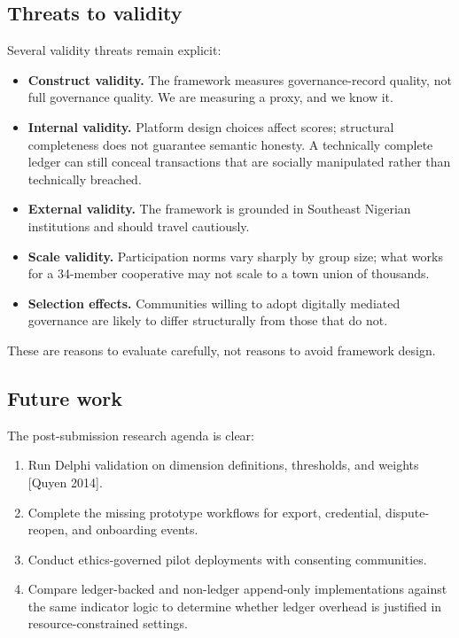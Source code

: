 \documentclass[sigconf,anonymous]{acmart}
\begin{document}
\subsection{Threats to validity}

Several validity threats remain explicit:
\begin{itemize}
\item \textbf{Construct validity.} The framework measures governance-record quality, not full governance quality. We are measuring a proxy, and we know it.
\item \textbf{Internal validity.} Platform design choices affect scores; structural completeness does not guarantee semantic honesty. A technically complete ledger can still conceal transactions that are socially manipulated rather than technically breached.
\item \textbf{External validity.} The framework is grounded in Southeast Nigerian institutions and should travel cautiously.
\item \textbf{Scale validity.} Participation norms vary sharply by group size; what works for a 34-member cooperative may not scale to a town union of thousands.
\item \textbf{Selection effects.} Communities willing to adopt digitally mediated governance are likely to differ structurally from those that do not.
\end{itemize}

These are reasons to evaluate carefully, not reasons to avoid framework design.

\subsection{Future work}

The post-submission research agenda is clear:
\begin{enumerate}
\item Run Delphi validation on dimension definitions, thresholds, and weights [Quyen 2014].
\item Complete the missing prototype workflows for export, credential, dispute-reopen, and onboarding events.
\item Conduct ethics-governed pilot deployments with consenting communities.
\item Compare ledger-backed and non-ledger append-only implementations against the same indicator logic to determine whether ledger overhead is justified in resource-constrained settings.
\end{enumerate}
\end{document}
